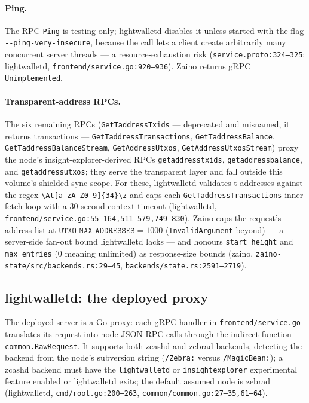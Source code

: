 \documentclass[11pt,a4paper]{article}
\theoremstyle{definition}
\begin{document}
\paragraph{Ping.} The RPC \texttt{Ping} is testing-only; lightwalletd
disables it unless started with the flag
\texttt{-{}-ping-very-insecure}, because the call lets a client create
arbitrarily many concurrent server threads --- a
resource-exhaustion risk (\texttt{service.proto:324--325};
\textsf{lightwalletd},
\texttt{frontend/\allowbreak service.go:920--936}). Zaino
returns gRPC \texttt{Unimplemented}.

\paragraph{Transparent-address RPCs.} The six remaining RPCs
(\texttt{GetTaddressTxids} --- deprecated and misnamed, it returns
transactions --- \texttt{GetTaddressTransactions},
\texttt{GetTaddressBalance}, \texttt{GetTaddressBalanceStream},
\texttt{GetAddressUtxos}, \texttt{GetAddressUtxosStream}) proxy the
node's insight-explorer-derived RPCs \texttt{getaddresstxids},
\texttt{getaddressbalance}, and \texttt{getaddressutxos}; they serve the
transparent layer and fall outside this volume's shielded-sync scope.
For these, lightwalletd validates t-addresses against the regex
\texttt{\textbackslash At[a-zA-Z0-9]\{34\}\textbackslash z} and caps each
\texttt{GetTaddressTransactions} inner fetch loop with a 30-second
context timeout (\textsf{lightwalletd},
\texttt{frontend/service.go:55--164,511--579,749--830}). Zaino caps the
request's address list at $\mathtt{UTXO\_MAX\_ADDRESSES} = 1000$
(\texttt{InvalidArgument} beyond) --- a server-side fan-out bound
lightwalletd lacks --- and honours \texttt{start\_height} and
\texttt{max\_entries} ($0$ meaning unlimited) as response-size bounds
(\textsf{zaino}, \texttt{zaino-state/src/backends.rs:29--45},
\texttt{backends/state.rs:2591--2719}).

\subsection{lightwalletd: the deployed proxy}\label{sec:sync-lwd}

The deployed server is a Go proxy: each gRPC handler in
\texttt{frontend/service.go} translates its request into node JSON-RPC
calls through the indirect function \texttt{common.RawRequest}. It
supports both zcashd and zebrad backends, detecting the backend from the
node's subversion string (\texttt{/Zebra:} versus \texttt{/MagicBean:});
a zcashd backend must have the \texttt{lightwalletd} or
\texttt{insightexplorer} experimental feature enabled or lightwalletd
exits; the default assumed node is zebrad (\textsf{lightwalletd},
\texttt{cmd/root.go:200--263}, \texttt{common/common.go:27--35,61--64}).
\end{document}
